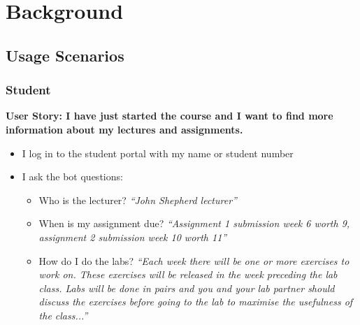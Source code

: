 \section{Background}

\subsection{Usage Scenarios}
\subsubsection{Student}
\textbf{User Story: I have just started the course and I want to find more information about my lectures and assignments.}
\begin{itemize}
    \item{I log in to the student portal with my name or student number}
    \item{I ask the bot questions:}
    \begin{itemize}
        \item{Who is the lecturer? \textit{“John Shepherd lecturer”}}
        \item{When is my assignment due? \textit{“Assignment 1 submission week 6 worth 9, assignment 2 submission week 10 worth 11”}}
        \item{How do I do the labs? \textit{“Each week there will be one or more exercises to work on. These exercises will be released in the week preceding the lab class. Labs will be done in pairs and you and your lab partner should discuss the exercises before going to the lab to maximise the usefulness of the class...”}}
    \end{itemize}
\end{itemize}

